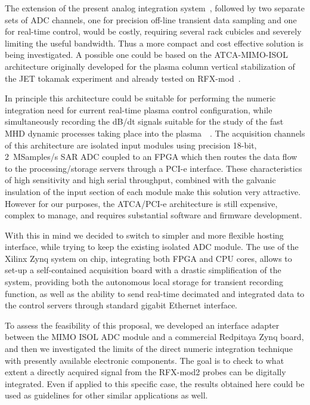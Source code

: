 The extension of the present analog integration system~\cite{pomaro2005transducers}, followed by two separate sets of ADC channels, one for precision off-line transient data sampling and one for real-time control, would be costly, requiring several rack cubicles and severely limiting the useful bandwidth. Thus a more compact and cost effective solution is being investigated. A possible one could be based on the ATCA-MIMO-ISOL~\cite{carvalho2010reconfigurable} architecture originally developed for the plasma column vertical stabilization of the JET tokamak experiment and already tested on RFX-mod~\cite{manduchi2012upgrade}. 

In principle this architecture could be suitable for performing the numeric integration need for current real-time plasma control configuration, while simultaneously recording the dB/dt signals suitable for the study of the fast MHD dynamic processes taking place into the plasma~\cite{zuin2009current}~\cite{innocente2014tearing}. The acquisition channels of this architecture are isolated input modules using precision 18-bit, 2~MSamples/s SAR ADC coupled to an FPGA which then routes the data flow to the processing/storage servers through a PCI-e interface. These characteristics of high sensitivity and high serial throughput, combined with the galvanic insulation of the input section of each module make this solution very attractive.
However for our purposes, the ATCA/PCI-e architecture is still expensive, complex to manage, and requires substantial software and firmware development. 

With this in mind we decided to switch to simpler and more flexible hosting interface, while trying to keep the existing isolated ADC module. The use of the Xilinx Zynq system on chip, integrating both FPGA and CPU cores, allows to set-up a self-contained acquisition board with a drastic simplification of the system, providing both the autonomous local storage for transient recording function, as well as the ability to send real-time decimated and integrated data to the control servers through standard gigabit Ethernet interface. 

To assess the feasibility of this proposal, we developed an interface adapter between the MIMO ISOL ADC module and a commercial Redpitaya Zynq board, and then we investigated the limits of the direct numeric integration technique with presently available electronic components.
The goal is to check to what extent a directly acquired signal from the RFX-mod2 probes can be digitally integrated. Even if applied to this specific case, the results obtained here could be used as guidelines for other similar applications as well. 


